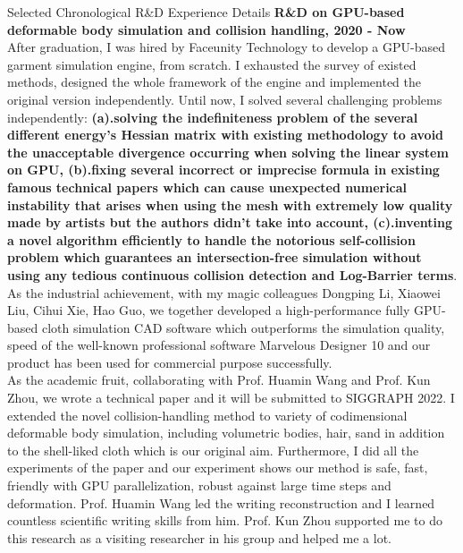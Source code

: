 \documentclass{resume} %
\begin{document}
\begin{rSection}{Selected Chronological R\&D Experience Details}
  {\bf R\&D on GPU-based deformable body simulation and collision handling, 2020 - Now}\\ After graduation, I was hired by Faceunity Technology to develop a GPU-based garment simulation engine, from scratch. I exhausted the survey of existed methods, designed the whole framework of the engine and implemented the original version independently. Until now, I solved several challenging problems independently: \textbf{(a).solving the indefiniteness problem of the several different energy’s Hessian matrix with existing methodology to avoid the unacceptable divergence occurring when solving the linear system on GPU, (b).fixing several incorrect or imprecise formula in existing famous technical papers which can cause unexpected numerical instability that arises when using the mesh with extremely low quality made by artists but the authors didn't take into account, (c).inventing a novel algorithm efficiently to handle the notorious self-collision problem which guarantees an intersection-free simulation without using any tedious continuous collision detection and Log-Barrier terms}.\\
  \hspace*{2em} As the industrial achievement, with my magic colleagues Dongping Li, Xiaowei Liu, Cihui Xie, Hao Guo, we together developed a high-performance fully GPU-based cloth simulation CAD software which outperforms the simulation quality, speed of the well-known professional software Marvelous Designer 10 and our product has been used for commercial purpose successfully. \\
  \hspace*{2em} As the academic fruit, collaborating with Prof. Huamin Wang and Prof. Kun Zhou, we wrote a technical paper and it will be submitted to SIGGRAPH 2022. I extended the novel collision-handling method to variety of codimensional deformable body simulation, including volumetric bodies, hair, sand in addition to the shell-liked cloth which is our original aim. Furthermore, I did all the experiments of the paper and our experiment shows our method is safe, fast, friendly with GPU parallelization, robust against large time steps and deformation. Prof. Huamin Wang led the writing reconstruction and I learned countless scientific writing skills from him. Prof. Kun Zhou supported me to do this research as a visiting researcher in his group and helped me a lot.\\

\end{rSection}
\end{document}
